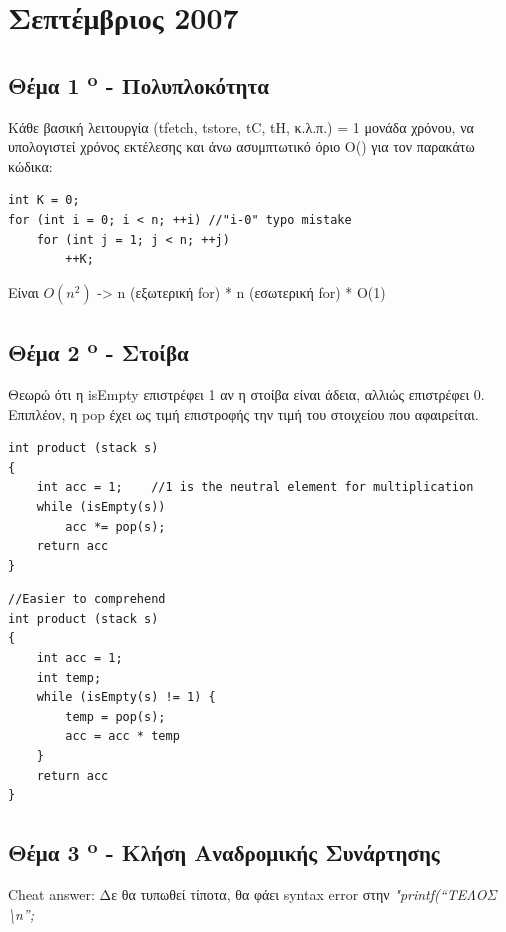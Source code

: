 \documentclass[a4paper,10pt]{article}
\begin{document}
\renewcommand{\labelenumi}{\roman{enumi})}
\renewcommand{\labelenumii}{(\arabic{enumii})}



\section{Σεπτέμβριος 2007}
\setcounter{section}{1}

\subsection{Θέμα 1 \textsuperscript{o} - Πολυπλοκότητα}
Κάθε βασική λειτουργία (tfetch, tstore, tC, tH, κ.λ.π.) = 1 μονάδα χρόνου, να
υπολογιστεί χρόνος εκτέλεσης και άνω ασυμπτωτικό όριο Ο() για τον παρακάτω
κώδικα:

\begin{verbatim}
int K = 0;
for (int i = 0; i < n; ++i) //"i-0" typo mistake
    for (int j = 1; j < n; ++j)
        ++K;
\end{verbatim}
Είναι $O(n^2)$ -> n (εξωτερική for) * n (εσωτερική for) * O(1)

\subsection{Θέμα 2 \textsuperscript{o} - Στοίβα}
Θεωρώ ότι η isEmpty επιστρέφει 1 αν η στοίβα είναι άδεια, αλλιώς επιστρέφει 0.
Επιπλέον, η pop έχει ως τιμή επιστροφής την τιμή του στοιχείου που αφαιρείται.

\begin{verbatim}
int product (stack s)
{
    int acc = 1;    //1 is the neutral element for multiplication
    while (isEmpty(s))
        acc *= pop(s);
    return acc
}
\end{verbatim}

\begin{verbatim}
//Easier to comprehend
int product (stack s)
{
    int acc = 1;
    int temp;
    while (isEmpty(s) != 1) {
        temp = pop(s);
        acc = acc * temp
    }
    return acc
}

\end{verbatim}

\subsection{Θέμα 3 \textsuperscript{o} - Κλήση Αναδρομικής Συνάρτησης}
Cheat answer:
Δε θα τυπωθεί τίποτα, θα φάει syntax error στην \textit{"printf(“ΤΕΛΟΣ
\textbackslash{}n”;} \\
\end{document}
